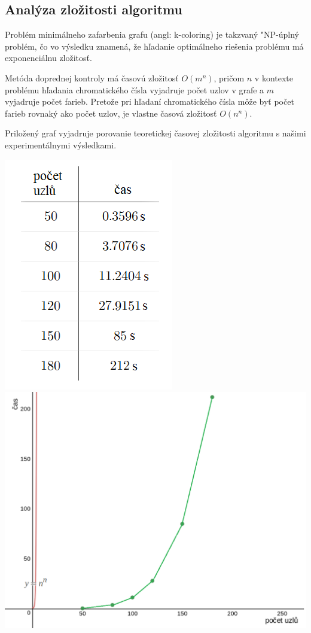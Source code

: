 \documentclass[a4paper,11pt]{article}
\begin{document}
\subsection{Analýza zložitosti algoritmu}
Problém minimálneho zafarbenia grafu (angl: k-coloring) je takzvaný "NP-úplný problém, čo vo výsledku znamená, že hľadanie optimálneho riešenia problému má exponenciálnu zložitosť.

Metóda doprednej kontroly má časovú zložitosť $O(m^n)$, pričom $n$ v kontexte problému hľadania chromatického čísla vyjadruje počet uzlov v grafe a $m$ vyjadruje počet farieb. Pretože pri hľadaní chromatického čísla môže byť počet farieb rovnaký ako počet uzlov, je vlastne časová zložitosť $O(n^n)$.

Priložený graf vyjadruje porovanie teoretickej časovej zložitosti algoritmu s našimi experimentálnymi výsledkami.

\enspace
\includegraphics[scale=0.58]{hodnoty.png}\includegraphics[scale=0.25]{graf_porovnanie.png}
\end{document}
